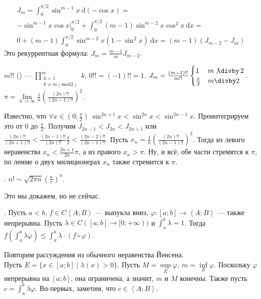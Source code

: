 \documentclass{article}
\newcommand*{\ab}[1][a;b]{{\left\langle #1\right\rangle}}
\begin{document}
\begin{itemize}
\begin{Proof}
\[\begin{split}
                J_m=\int_0^{\pi/2}\sin^{m-1}x~\mathrm d(-\cos x)=\\
                -\sin^{m-1}x\cos x\big|_0^{\pi/2}+\int_0^{\pi/2}(m-1)\sin^{m-2}x\cos^2x~\mathrm dx=\\
                0+(m-1)\int_0^{\pi/2}\sin^{m-2}x(1-\sin^2x)~\mathrm dx=(m-1)(J_{m-2}-J_m)
            \end{split}
            \]
            Это рекуррентная формула: $J_m=\frac{m-1}mJ_{m-2}$.
        \end{Proof}
        \dfn $m!!$ () --- $\prod\limits_{\substack{k=1\\k\equiv m(\mathrm{mod} 2)}}^mk$, $0!!=(-1)!!=1$.
        \thm $J_m=\frac{(m-1)!!}{m!!}\begin{cases}
            1 & m\mathop{\not\divby}2\\
            \frac\pi2 & m\divby2
        \end{cases}$.
        \thm {} $\pi=\lim\limits_{n\to\infty}\frac1n\left(\frac{(2n)!!}{(2n-1)!!}\right)^2$.
        \begin{Proof}
            Известно, что $\forall x\in(0;\frac\pi2)~\sin^{2n+1}x<\sin^{2n}x<\sin^{2n-1}x$.
            Проинтегрируем это от 0 до $\frac\pi2$. Получим $J_{2n-1}<J_{2n}<J_{2n+1}$ или $\frac{(2n)!!}{(2n+1)!!}<\frac{(2n-1)!!}{(2n)!!}\frac\pi2<\frac{(2n-2)!!}{(2n-1)!!}$. Пусть $x_n=\frac1n\left(\frac{(2n)!!}{(2n-1)!!}\right)^2$. Тогда из левого неравенства $x_n<\frac{2n+1}{2n}\pi$, а из правого $x_n>\pi$. Ну, и всё, обе части стремятся к $\pi$, по лемме о двух милиционерах $x_n$ также стремится к $\pi$.
        \end{Proof}
        \thm {}. $n!\sim\sqrt{2\pi n}\left(\frac ne\right)^n$.
        \begin{Proof}
            Это мы докажем, но не сейчас.
        \end{Proof}
        \thm {}. Пусть $a<b$, $f\in C\ab[A;B]$ --- выпукла вниз, $\varphi\colon[a;b]\to\ab[A;B]$ --- также непрерывна. Пусть $\lambda\in C([a;b]\to[0;+\infty))$ и $\int_a^b\lambda=1$. Тогда $f\left(\int_a^b\lambda\varphi\right)\leqslant\int_a^b\lambda\cdot(f\circ\varphi)$.
        \begin{Proof}
            Повторим рассуждения из обычного неравенства Йенсена.\\
            Пусть $E=\{x\in[a;b]\mid\lambda(x)>0\}$. Пусть $M=\sup\limits_E\varphi$, $m=\inf\limits_E\varphi$. Поскольку $\varphi$ непрерывна на $[a;b]$, она ограничена, а значит, $m$ и $M$ конечны. Также пусть $c=\int_a^b\lambda\varphi$. Во-первых, заметим, что $c\in\ab[A;B]$.\\

\end{Proof}
\end{itemize}
\end{document}
